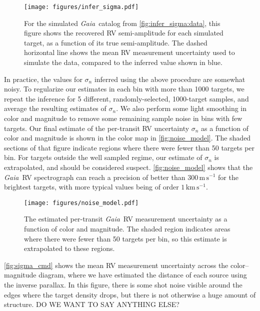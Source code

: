 \documentclass[modern, letterpaper]{aastex631}
\newcommand{\project}[1]{\textsl{#1}}
\newcommand{\Gaia}{\project{Gaia}}
\begin{document}
\begin{figure}
	\begin{centering}
		\texttt{[image: figures/infer\_sigma.pdf]}
		\caption{For the simulated \Gaia\ catalog from \autoref{fig:infer_sigma:data}, this figure shows the recovered RV semi-amplitude for each simulated target, as a function of its true semi-amplitude.
			The dashed horizontal line shows the mean RV measurement uncertainty used to simulate the data, compared to the inferred value shown in blue.}
		\label{fig:infer_sigma:results}
	\end{centering}
\end{figure}

In practice, the values for $\sigma_n$ inferred using the above procedure are somewhat noisy.
To regularize our estimates in each bin with more than 1000 targets, we repeat the inference for 5 different, randomly-selected, 1000-target samples, and average the resulting estimates of $\sigma_n$.
We also perform some light smoothing in color and magnitude to remove some remaining sample noise in bins with few targets.
Our final estimate of the per-transit RV uncertainty $\sigma_n$ as a function of color and magnitude is shown in the color map in \autoref{fig:noise_model}.
The shaded sections of that figure indicate regions where there were fewer than 50 targets per bin.
For targets outside the well sampled regime, our estimate of $\sigma_n$ is extrapolated, and should be considered suspect.
\autoref{fig:noise_model} shows that the \Gaia\ RV spectrograph can reach a precision of better than $300\,\mathrm{m\,s^{-1}}$ for the brightest targets, with more typical values being of order $1\,\mathrm{km\,s^{-1}}$.

\begin{figure}
	\begin{centering}
		\texttt{[image: figures/noise\_model.pdf]}
		\caption{The estimated per-transit \Gaia\ RV measurement uncertainty as a function of color and magnitude.
			The shaded region indicates areas where there were fewer than 50 targets per bin, so this estimate is extrapolated to these regions.}
		\label{fig:noise_model}
	\end{centering}
\end{figure}

\autoref{fig:sigma_cmd} shows the mean RV measurement uncertainty across the color--magnitude diagram, where we have estimated the distance of each source using the inverse parallax.
In this figure, there is some shot noise visible around the edges where the target density drops, but there is not otherwise a huge amount of structure.
DO WE WANT TO SAY ANYTHING ELSE?
\end{document}
